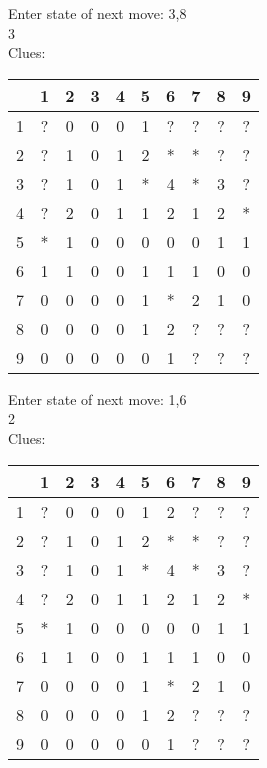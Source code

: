 Enter state of next move: 3,8\\
3\\
Clues:\\
\begin{tabular}{|c|c|c|c|c|c|c|c|c|c|}
\hline
  & 1 & 2 & 3 & 4 & 5 & 6 & 7 & 8 & 9\\
\hline
1 & ? & 0 & 0 & 0 & 1 & ? & ? & ? & ?\\
\hline
2 & ? & 1 & 0 & 1 & 2 & * & * & ? & ?\\
\hline
3 & ? & 1 & 0 & 1 & * & 4 & * & 3 & ?\\
\hline
4 & ? & 2 & 0 & 1 & 1 & 2 & 1 & 2 & *\\
\hline
5 & * & 1 & 0 & 0 & 0 & 0 & 0 & 1 & 1\\
\hline
6 & 1 & 1 & 0 & 0 & 1 & 1 & 1 & 0 & 0\\
\hline
7 & 0 & 0 & 0 & 0 & 1 & * & 2 & 1 & 0\\
\hline
8 & 0 & 0 & 0 & 0 & 1 & 2 & ? & ? & ?\\
\hline
9 & 0 & 0 & 0 & 0 & 0 & 1 & ? & ? & ?\\
\hline
\end{tabular}

Enter state of next move: 1,6\\
2\\
Clues:\\
\begin{tabular}{|c|c|c|c|c|c|c|c|c|c|}
\hline
  & 1 & 2 & 3 & 4 & 5 & 6 & 7 & 8 & 9\\
\hline
1 & ? & 0 & 0 & 0 & 1 & 2 & ? & ? & ?\\
\hline
2 & ? & 1 & 0 & 1 & 2 & * & * & ? & ?\\
\hline
3 & ? & 1 & 0 & 1 & * & 4 & * & 3 & ?\\
\hline
4 & ? & 2 & 0 & 1 & 1 & 2 & 1 & 2 & *\\
\hline
5 & * & 1 & 0 & 0 & 0 & 0 & 0 & 1 & 1\\
\hline
6 & 1 & 1 & 0 & 0 & 1 & 1 & 1 & 0 & 0\\
\hline
7 & 0 & 0 & 0 & 0 & 1 & * & 2 & 1 & 0\\
\hline
8 & 0 & 0 & 0 & 0 & 1 & 2 & ? & ? & ?\\
\hline
9 & 0 & 0 & 0 & 0 & 0 & 1 & ? & ? & ?\\
\hline
\end{tabular}

